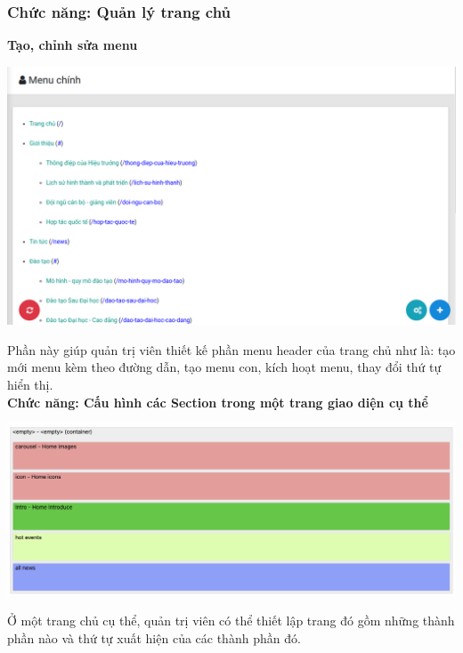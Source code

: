 \subsubsection{Chức năng: Quản lý trang chủ}
\textbf{Tạo, chỉnh sửa menu}
\begin{center}
  \captionsetup{type=figure}
  \includegraphics[width=15cm]{img/Screen/menu.png}
\end{center}

Phần này giúp quản trị viên thiết kế phần menu header của trang chủ như là: tạo mới menu kèm theo đường dẫn, tạo menu con, kích hoạt menu, thay đổi thứ tự hiển thị.\\

\textbf{Chức năng: Cấu hình các Section trong một trang giao diện cụ thể}
\begin{center}
  \captionsetup{type=figure}
  \includegraphics[width=15cm]{img/Screen/section.png}
\end{center}

Ở một trang chủ cụ thể, quản trị viên có thể thiết lập trang đó gồm những thành phần nào và thứ tự xuất hiện của các thành phần đó.\\

